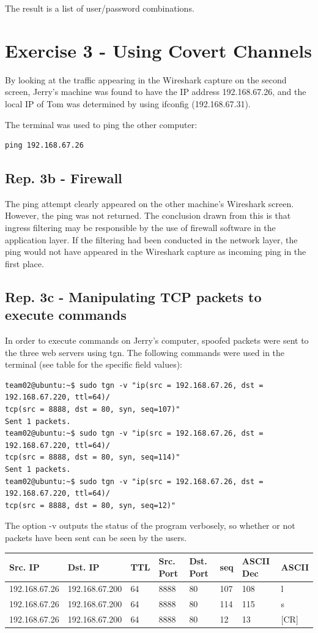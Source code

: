 \documentclass{article}
\begin{document}
The result is a list of user/password combinations.

\newpage
\section*{Exercise 3 - Using Covert Channels}

By looking at the traffic appearing in the Wireshark capture on the second screen, Jerry's machine was found to have the IP address 192.168.67.26, and the local IP of Tom was determined by using ifconfig (192.168.67.31).

The terminal was used to ping the other computer:
\begin{verbatim}
ping 192.168.67.26
\end{verbatim}

\subsection*{Rep. 3b - Firewall}
The ping attempt clearly appeared on the other machine's Wireshark screen. However, the ping was not returned. The conclusion drawn from this is that ingress filtering may be responsible by the use of firewall software in the application layer. If the filtering had been conducted in the network layer, the ping would not have appeared in the Wireshark capture as incoming ping in the first place.

\subsection*{Rep. 3c - Manipulating TCP packets to execute commands}
In order to execute commands on Jerry's computer, spoofed packets were sent to the three web servers using tgn. The following commands were used in the terminal (see table for the specific field values):
\begin{verbatim}
team02@ubuntu:~$ sudo tgn -v "ip(src = 192.168.67.26, dst = 192.168.67.220, ttl=64)/
tcp(src = 8888, dst = 80, syn, seq=107)"
Sent 1 packets.
team02@ubuntu:~$ sudo tgn -v "ip(src = 192.168.67.26, dst = 192.168.67.220, ttl=64)/
tcp(src = 8888, dst = 80, syn, seq=114)"
Sent 1 packets.
team02@ubuntu:~$ sudo tgn -v "ip(src = 192.168.67.26, dst = 192.168.67.220, ttl=64)/
tcp(src = 8888, dst = 80, syn, seq=12)"
\end{verbatim}
The option -v outputs the status of the program verbosely, so whether or not packets have been sent can be seen by the users. 

\begin{center}
    \begin{tabular}{ | l | l | l | l | l | l | l | l | }
    \hline
    Src. IP & Dst. IP & TTL & Src. Port & Dst. Port & seq & ASCII Dec & ASCII\\ \hline
    192.168.67.26 & 192.168.67.200 & 64 & 8888 & 80 & 107 & 108 & l\\ \hline
    192.168.67.26 & 192.168.67.200 & 64 & 8888 & 80 & 114 & 115 & s\\ \hline
    192.168.67.26 & 192.168.67.200 & 64 & 8888 & 80 & 12 & 13 & [CR] \\ \hline
    \end{tabular}
\end{center}
\end{document}
